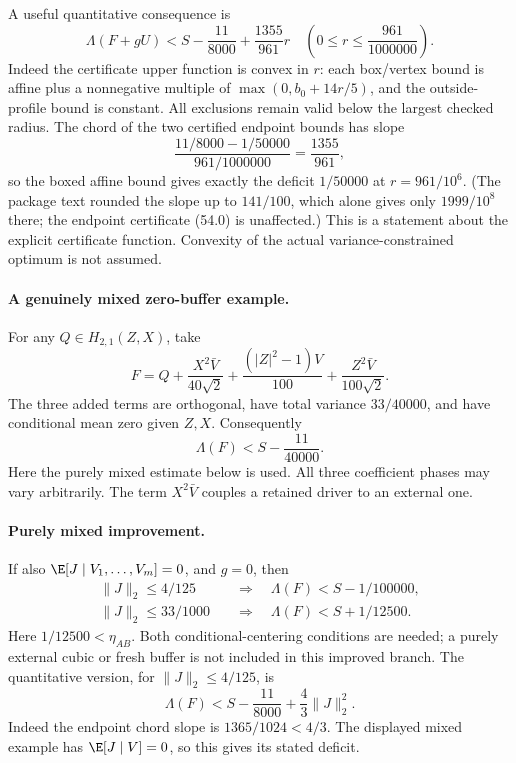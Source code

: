 A useful quantitative consequence is
\[
\boxed{\Lambda(F+gU)<
S-\frac{11}{8000}+\frac{1355}{961}r
\quad\left(0\le r\le\frac{961}{1000000}\right).}
\tag{54.0a}
\]
Indeed the certificate upper function is convex in \(r\):
each box/vertex bound is affine plus a nonnegative multiple of
\(\max(0,b_0+14r/5)\), and the outside-profile bound is constant.
All exclusions remain valid below the largest checked radius.
The chord of the two certified endpoint bounds has slope
\[
\frac{11/8000-1/50000}{961/1000000}
=\frac{1355}{961},
\]
so the boxed affine bound gives exactly the deficit $1/50000$ at $r=961/10^6$. (The package text rounded the
slope up to $141/100$, which alone gives only $1999/10^8$ there; the endpoint certificate (54.0) is unaffected.)
This is a statement about the explicit certificate function.
Convexity of the actual variance-constrained optimum is not assumed.

\paragraph{A genuinely mixed zero-buffer example.}
For any \(Q\in H_{2,1}(Z,X)\), take
\[
F=Q+\frac{X^2\bar V}{40\sqrt2}
       +\frac{(|Z|^2-1)V}{100}
       +\frac{Z^2\bar V}{100\sqrt2}.
\]
The three added terms are orthogonal, have total variance
\(33/40000\), and have conditional mean zero given \(Z,X\).
Consequently
\[
\Lambda(F)<S-\frac{11}{40000}.
\]
Here the purely mixed estimate below is used.
All three coefficient phases may vary arbitrarily.
The term \(X^2\bar V\) couples a retained driver to an external one.

\paragraph{Purely mixed improvement.}
If also \(\E[J\mid V_1,\ldots,V_m]=0\), and \(g=0\), then
\[
\begin{aligned}
\|J\|_2\le 4/125&\quad\Longrightarrow\quad
\Lambda(F)<S-1/100000,\\
\|J\|_2\le 33/1000&\quad\Longrightarrow\quad
\Lambda(F)<S+1/12500.
\end{aligned}
\]
Here \(1/12500<\eta_{AB}\). Both conditional-centering conditions
are needed; a purely external cubic or fresh buffer is not included
in this improved branch.
The quantitative version, for \(\|J\|_2\le4/125\), is
\[
\Lambda(F)<S-\frac{11}{8000}+\frac43\|J\|_2^2.
\]
Indeed the endpoint chord slope is \(1365/1024<4/3\).
The displayed mixed example has \(\E[J\mid V]=0\), so this
gives its stated deficit.

